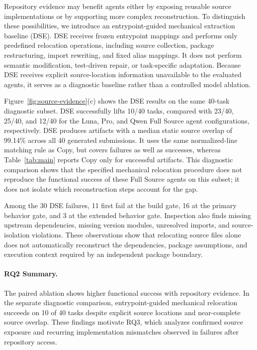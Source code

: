 \documentclass[acmsmall,screen,review,anonymous]{acmart}
\begin{document}
Repository evidence may benefit agents either by exposing reusable source
implementations or by supporting more complex reconstruction. To distinguish
these possibilities, we introduce an entrypoint-guided mechanical extraction
baseline (DSE). DSE receives frozen entrypoint mappings and performs only
predefined relocation operations, including source collection, package
restructuring, import rewriting, and fixed alias mappings. It does not perform
semantic modification, test-driven repair, or task-specific adaptation.
Because DSE receives explicit source-location information unavailable to the
evaluated agents, it serves as a diagnostic baseline rather than a controlled
model ablation.

Figure~\ref{fig:source-evidence}(c) shows the DSE results on the same 40-task
diagnostic subset. DSE successfully lifts 10/40 tasks, compared with 23/40,
25/40, and 12/40 for the Luna, Pro, and Qwen Full Source agent configurations,
respectively. DSE produces artifacts with a median static source overlap of
99.14\% across all 40 generated submissions. It uses the same normalized-line
matching rule as Copy, but covers failures as well as successes, whereas
Table~\ref{tab:main} reports Copy only for successful artifacts. This diagnostic
comparison shows
that the specified mechanical relocation procedure does not reproduce the
functional success of these Full Source agents on this subset; it does not
isolate which reconstruction steps account for the gap.

Among the 30 DSE failures, 11 first fail at the build gate, 16 at the primary
behavior gate, and 3 at the extended behavior gate. Inspection also finds
missing upstream dependencies, missing version modules, unresolved imports,
and source-isolation violations. These observations show that relocating source
files alone does not automatically reconstruct the dependencies, package
assumptions, and execution context required by an independent package
boundary.

\paragraph{RQ2 Summary.}
The paired ablation shows higher functional success with repository evidence.
In the separate diagnostic comparison, entrypoint-guided mechanical relocation
succeeds on 10 of 40 tasks despite explicit source locations and near-complete
source overlap. These findings motivate RQ3, which analyzes confirmed source
exposure and recurring implementation mismatches observed in failures after
repository access.
\end{document}
